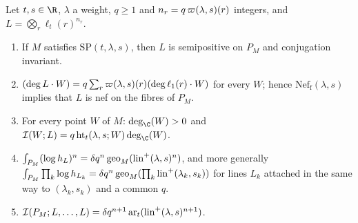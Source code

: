\begin{lemma}\label{pf:volthm:lem:comb}
Let $t,s\in\R$, $\lambda$ a weight, $q\ge1$ and $n_r=q\,\varpi(\lambda,s)(r)$ integers, and
$L=\bigotimes_r\ell_t(r)^{n_r}$.
\begin{enumerate}[label=(\alph*)]
\item If $M$ satisfies $\mathrm{SP}(t,\lambda,s)$, then $L$ is semipositive on $P_M$ and conjugation
  invariant.
\item $(\deg L\cdot W)=q\sum_r\varpi(\lambda,s)(r)(\deg\ell_1(r)\cdot W)$ for every
  $W$; hence $\mathrm{Nef}_{\mathrm f}(\lambda,s)$ implies that $L$ is nef on the fibres of $P_M$.
\item For every point $W$ of $M$: $\deg_\C(W)>0$ and $\volthmII(W;L)=q\,\mathrm{ht}_t(\lambda,s;W)\deg_\C(W)$.
\item $\int_{P_M}(\log h_L)^n=\delta q^n\,\mathrm{geo}_M(\mathrm{lin}^+(\lambda,s)^n)$, and more generally
  $\int_{P_M}\prod_{k}\log h_{L_k}=\delta q^n\,\mathrm{geo}_M(\prod_k\mathrm{lin}^+(\lambda_k,s_k))$ for lines
  $L_k$ attached in the same way to $(\lambda_k,s_k)$ and a common $q$.
\item $\mathcal{I}(P_M;L,\dots,L)=\delta q^{n+1}\,\mathrm{ar}_t(\mathrm{lin}^+(\lambda,s)^{n+1})$.
\end{enumerate}
\end{lemma}

